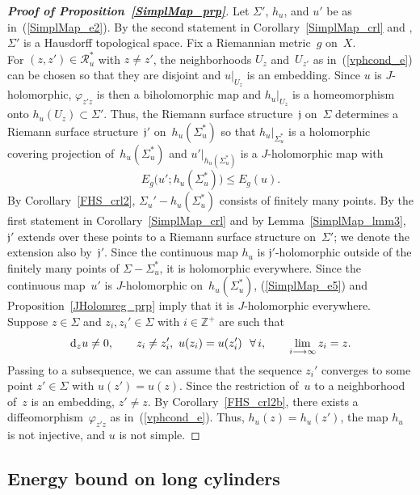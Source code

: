 \documentclass[11pt]{article}
\numberwithin{equation}{section}
\theoremstyle{definition}
\def\BE#1{\begin{equation}\label{#1}}
\def\EE{\end{equation}}
\def\eref#1{(\ref{#1})}
\def\lra{\longrightarrow}
\def\fj{\mathfrak j}
\def\cR{\mathcal R}
\def\Z{{\mathbb Z}}
\def\vph{\varphi}
\def\Si{\Sigma}
\def\i{\infty}
\def\nd{\textnormal{d}}
\begin{document}
\begin{proof}[{\bf\emph{Proof of Proposition~\ref{SimplMap_prp}}}]
Let $\Si'$, $h_u$, and $u'$ be as in~\eref{SimplMap_e2}.
By the second statement in Corollary~\ref{SimplMap_crl} and \cite[Lemma~73.3]{Mu},
$\Si'$ is a Hausdorff topological space.
Fix a Riemannian metric~$g$ on~$X$.\\

\noindent
For $(z,z')\!\in\!\cR_u^*$ with $z\!\neq\!z'$, 
the neighborhoods $U_z$ and~$U_{z'}$ as in~\eref{vphcond_e}
can be chosen so that they are disjoint and $u|_{U_z}$ is an embedding.
Since $u$ is  $J$-holomorphic, $\vph_{z'z}$ is then a biholomorphic map 
and $h_u|_{U_z}$ is a homeomorphism onto $h_u(U_z)\!\subset\!\Si'$.
Thus, the Riemann surface structure~$\fj$ on~$\Si$ determines a Riemann surface structure~$\fj'$
on~$h_u(\Si_u^*)$ so that $h_u|_{\Si_u^*}$ is a holomorphic covering projection
of~$h_u(\Si_u^*)$ and $u'|_{h_u(\Si_u^*)}$ is a $J$-holomorphic map with
\BE{SimplMap_e5}E_g\big(u';h_u(\Si_u^*)\big)\le E_g(u).\EE
By Corollary~\ref{FHS_crl2}, $\Si_u'\!-\!h_u(\Si_u^*)$ consists of finitely many points.
By the first statement in Corollary~\ref{SimplMap_crl} and by Lemma~\ref{SimplMap_lmm3},  
$\fj'$ extends over these points to a Riemann surface structure
on~$\Si'$; we denote the extension also by~$\fj'$.
Since the continuous map $h_u$ is $\fj'$-holomorphic outside of the finitely many points
of $\Si\!-\!\Si_u^*$, it is holomorphic everywhere.
Since the continuous map~$u'$ is $J$-holomorphic on~$h_u(\Si_u^*)$,
\eref{SimplMap_e5} and Proposition~\ref{JHolomreg_prp} imply that it is $J$-holomorphic everywhere.\\

\noindent
Suppose $z\!\in\!\Si$ and $z_i,z_i'\!\in\!\Si$ with $i\!\in\!\Z^+$ are such that 
$$\nd_zu\neq0, \qquad z_i\neq z_i',~u(z_i)=u(z_i')~~\forall\,i, \qquad \lim_{i\lra\i}z_i=z.$$
Passing to a subsequence, we can assume that the sequence $z_i'$ converges
to some point \hbox{$z'\!\in\!\Si$} with $u(z')\!=\!u(z)$.
Since the restriction of~$u$ to a neighborhood of~$z$ is an embedding,
$z'\!\neq\!z$.
By Corollary~\ref{FHS_crl2b}, there exists a diffeomorphism~$\vph_{z'z}$
as in~\eref{vphcond_e}.
Thus, $h_u(z)\!=\!h_u(z')$, the map $h_u$ is not injective, and $u$ is not simple.
\end{proof}



\subsection{Energy bound on long cylinders}
\label{CylEner_subs}
\end{document}
